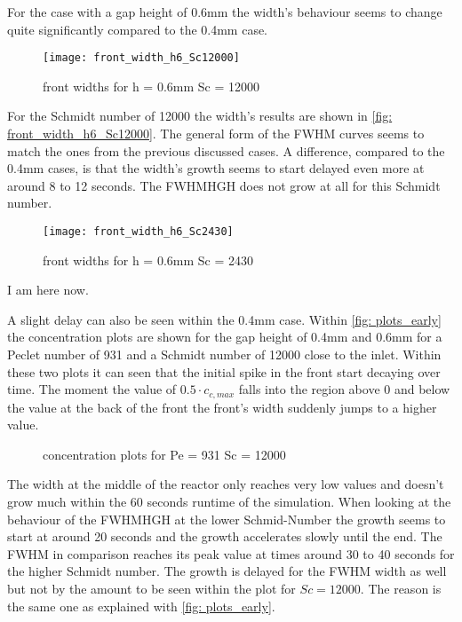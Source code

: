 \documentclass[../thesis.tex]{subfiles}
\begin{document}
For the case with a gap height of 0.6mm the width's behaviour seems to change quite significantly compared to the 0.4mm case. 
\begin{figure}[htb]
	\centering
	\texttt{[image: front\_width\_h6\_Sc12000]}
	\caption{front widths for  h = 0.6mm Sc = 12000}
	\label{fig: front_width_h6_Sc12000}
\end{figure}
For the Schmidt number of 12000 the width's results are shown in \autoref{fig: front_width_h6_Sc12000}. The general form of the FWHM curves seems to match the ones from the previous discussed cases. A difference, compared to the 0.4mm cases, is that the width's growth seems to start delayed even more at around 8 to 12 seconds. The FWHMHGH does not grow at all for this Schmidt number.
\begin{figure}[htb]
	\centering
	\texttt{[image: front\_width\_h6\_Sc2430]}
	\caption{front widths for  h = 0.6mm Sc = 2430}
	\label{fig: front_width_pos_h6_Sc2430}
\end{figure}
I am here now.

A slight delay can also be seen within the 0.4mm case. Within \autoref{fig: plots_early} the concentration plots are shown for the gap height of 0.4mm and 0.6mm for a Peclet number of 931 and a Schmidt number of 12000 close to the inlet. Within these two plots it can seen that the initial spike in the front start decaying over time. The moment the value of $0.5 \cdot c_{c,max}$ falls into the region above 0 and below the value at the back of the front the front's width suddenly jumps to a higher value.
\begin{figure}[htb]
	\centering
	\qquad
	\caption{concentration plots for  Pe = 931 Sc = 12000}%
	\label{fig: plots_early}%
\end{figure}
The width at the middle of the reactor only reaches very low values and doesn't grow much within the 60 seconds runtime of the simulation. When looking at the behaviour of the FWHMHGH at the lower Schmid-Number the growth seems to start at around 20 seconds and the growth accelerates slowly until the end. The FWHM in comparison reaches its peak value at times around 30 to 40 seconds for the higher Schmidt number. The growth is delayed for the FWHM width as well but not by the amount to be seen within the plot for $Sc = 12000$. The reason is the same one as explained with \autoref{fig: plots_early}.
\end{document}
